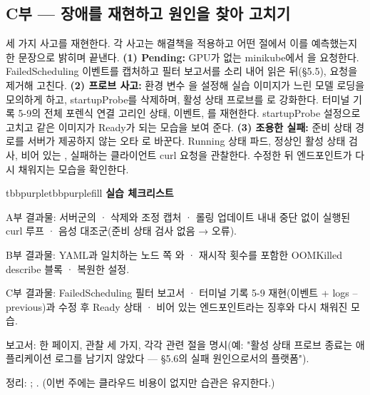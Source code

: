 \subsection*{C부 — 장애를 재현하고 원인을 찾아 고치기}

세 가지 사고를 재현한다. 각 사고는 해결책을 적용하고 어떤 절에서 이를 예측했는지 한 문장으로 밝히며 끝낸다. \textbf{(1) Pending:} GPU가 없는 minikube에서 을 요청한다. FailedScheduling 이벤트를 캡처하고 필터 보고서를 소리 내어 읽은 뒤(§5.5), 요청을 제거해 고친다. \textbf{(2) 프로브 사고:} 환경 변수 을 설정해 실습 이미지가 느린 모델 로딩을 모의하게 하고, startupProbe를 삭제하며, 활성 상태 프로브를 로 강화한다. 터미널 기록 5-9의 전체 포렌식 연결 고리인 상태, 이벤트, 를 재현한다. startupProbe 설정으로 고치고 같은 이미지가 Ready가 되는 모습을 보여 준다. \textbf{(3) 조용한 실패:} 준비 상태 경로를 서버가 제공하지 않는 오타 로 바꾼다. Running 상태 파드, 정상인 활성 상태 검사, 비어 있는 , 실패하는 클라이언트 curl 요청을 관찰한다. 수정한 뒤 엔드포인트가 다시 채워지는 모습을 확인한다.

\begin{calloutbox}{tbbpurple}{tbbpurplefill}
{\normalsize\bfseries\color{tbbpurple}실습 체크리스트}\par\vspace{3pt}
\begin{tbbitemize}
  \item A부 결과물: 서버군의  · 삭제와 조정 캡처 · 롤링 업데이트 내내 중단 없이 실행된 curl 루프 · 음성 대조군(준비 상태 검사 없음 → 오류).
  \item B부 결과물: YAML과 일치하는 노드 쪽 와  · 재시작 횟수를 포함한 OOMKilled describe 블록 · 복원한 설정.
  \item C부 결과물: FailedScheduling 필터 보고서 · 터미널 기록 5-9 재현(이벤트 + logs --previous)과 수정 후 Ready 상태 · 비어 있는 엔드포인트라는 징후와 다시 채워진 모습.
  \item 보고서: 한 페이지, 관찰 세 가지, 각각 관련 절을 명시(예: "활성 상태 프로브 종료는 애플리케이션 로그를 남기지 않았다 — §5.6의 실패 원인으로서의 플랫폼").
  \item 정리: ; . (이번 주에는 클라우드 비용이 없지만 습관은 유지한다.)
\end{tbbitemize}
\end{calloutbox}

